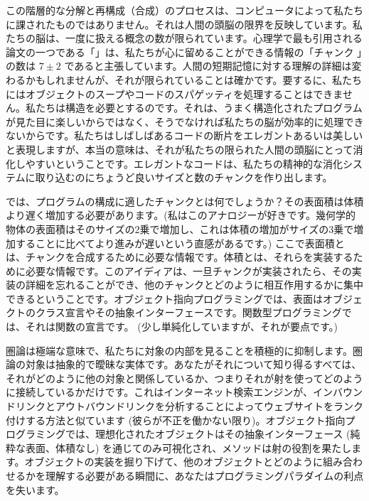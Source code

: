 この階層的な分解と再構成（合成）のプロセスは、コンピュータによって私たちに課されたものではありません。それは人間の頭脳の限界を反映しています。私たちの脳は、一度に扱える概念の数が限られています。心理学で最も引用される論文の一つである「」は、私たちが心に留めることができる情報の「チャンク 」の数は $7 \pm 2$ であると主張しています。人間の短期記憶に対する理解の詳細は変わるかもしれませんが、それが限られていることは確かです。要するに、私たちにはオブジェクトのスープやコードのスパゲッティを処理することはできません。私たちは構造を必要とするのです。それは、うまく構造化されたプログラムが見た目に楽しいからではなく、そうでなければ私たちの脳が効率的に処理できないからです。私たちはしばしばあるコードの断片をエレガントあるいは美しいと表現しますが、本当の意味は、それが私たちの限られた人間の頭脳にとって消化しやすいということです。エレガントなコードは、私たちの精神的な消化システムに取り込むのにちょうど良いサイズと数のチャンクを作り出します。

では、プログラムの構成に適したチャンクとは何でしょうか？その表面積は体積より遅く増加する必要があります。(私はこのアナロジーが好きです。幾何学的物体の表面積はそのサイズの2乗で増加し、これは体積の増加がサイズの3乗で増加することに比べてより進みが遅いという直感があるです。) ここで表面積とは、チャンクを合成するために必要な情報です。体積とは、それらを実装するために必要な情報です。このアイディアは、一旦チャンクが実装されたら、その実装の詳細を忘れることができ、他のチャンクとどのように相互作用するかに集中できるということです。オブジェクト指向プログラミングでは、表面はオブジェクトのクラス宣言やその抽象インターフェースです。関数型プログラミングでは、それは関数の宣言です。 (少し単純化していますが、それが要点です。) 

圏論は極端な意味で、私たちに対象の内部を見ることを積極的に抑制します。圏論の対象は抽象的で曖昧な実体です。あなたがそれについて知り得るすべては、それがどのように他の対象と関係しているか、つまりそれが射を使ってどのように接続しているかだけです。これはインターネット検索エンジンが、インバウンドリンクとアウトバウンドリンクを分析することによってウェブサイトをランク付けする方法と似ています (彼らが不正を働かない限り)。オブジェクト指向プログラミングでは、理想化されたオブジェクトはその抽象インターフェース (純粋な表面、体積なし) を通じてのみ可視化され、メソッドは射の役割を果たします。オブジェクトの実装を掘り下げて、他のオブジェクトとどのように組み合わせるかを理解する必要がある瞬間に、あなたはプログラミングパラダイムの利点を失います。

